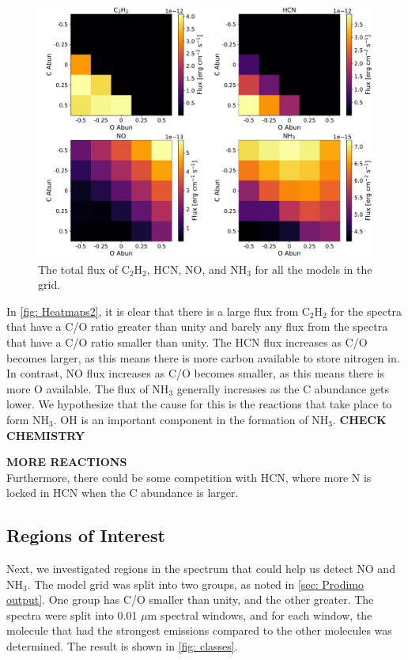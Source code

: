 \documentclass[oneside, single, authoryear, semicolon, 12pt]{lion-msc}
\newcommand{\4}{$_4$}
\newcommand{\3}{$_3$}
\newcommand{\2}{$_2$}
\begin{document}
\begin{figure}[H]
    \centering
    \includegraphics[width=\linewidth]{Figures/Heatmaps2.pdf}
    \caption{The total flux of C\2H\2, HCN, NO, and NH\3 for all the models in the grid.}
    \label{fig: Heatmaps2}
\end{figure}

In \autoref{fig: Heatmaps2}, it is clear that there is a large flux from C\2H\2 for the spectra that have a C/O ratio greater than unity and barely any flux from the spectra that have a C/O ratio smaller than unity. The HCN flux increases as C/O becomes larger, as this means there is more carbon available to store nitrogen in. In contrast, NO flux increases as C/O becomes smaller, as this means there is more O available. The flux of NH\3 generally increases as the C abundance gets lower. We hypothesize that the cause for this is the reactions that take place to form NH\3.
OH is an important component in the formation of NH\3. \textbf{CHECK CHEMISTRY}


\textbf{MORE REACTIONS}\\
Furthermore, there could be some competition with HCN, where more N is locked in HCN when the C abundance is larger. 

\subsection{Regions of Interest}
Next, we investigated regions in the spectrum that could help us detect NO and NH\3. The model grid was split into two groups, as noted in \autoref{sec: Prodimo output}. One group has C/O smaller than unity, and the other greater. The spectra were split into 0.01 $\mu$m spectral windows, and for each window, the molecule that had the strongest emissions compared to the other molecules was determined. The result is shown in \autoref{fig: classes}.
\end{document}
